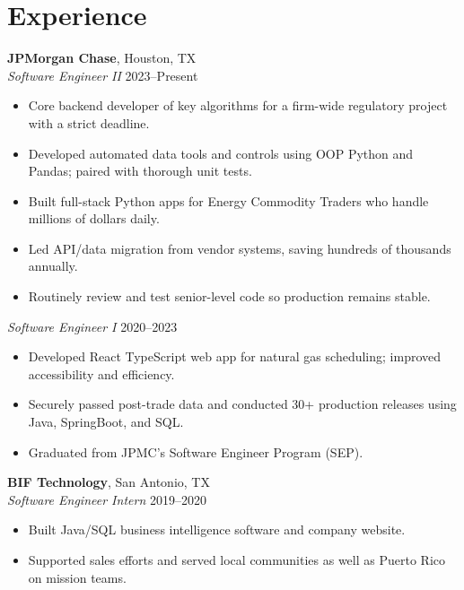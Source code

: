 \documentclass[10pt]{article}
\begin{document}
\section*{Experience}
\textbf{JPMorgan Chase}, Houston, TX \\
\textit{Software Engineer II} \hfill 2023--Present
\begin{itemize}[leftmargin=*]
  \item Core backend developer of key algorithms for a firm-wide regulatory project with a strict deadline. 
  \item Developed automated data tools and controls using OOP Python and Pandas; paired with thorough unit tests.
  \item Built full-stack Python apps for Energy Commodity Traders who handle millions of dollars daily.
  \item Led API/data migration from vendor systems, saving hundreds of thousands annually.
  \item Routinely review and test senior-level code so production remains stable.
  
\end{itemize}
\textit{Software Engineer I} \hfill 2020--2023
\begin{itemize}[leftmargin=*]
  \item Developed React TypeScript web app for natural gas scheduling; improved accessibility and efficiency.
  \item Securely passed post-trade data and conducted 30+ production releases using Java, SpringBoot, and SQL.
  \item Graduated from JPMC's Software Engineer Program (SEP).
\end{itemize}

\textbf{BIF Technology}, San Antonio, TX \\
\textit{Software Engineer Intern} \hfill 2019--2020
\begin{itemize}[leftmargin=*]
  \item Built Java/SQL business intelligence software and company website.
  \item Supported sales efforts and served local communities as well as Puerto Rico on mission teams.
\end{itemize}
\end{document}
